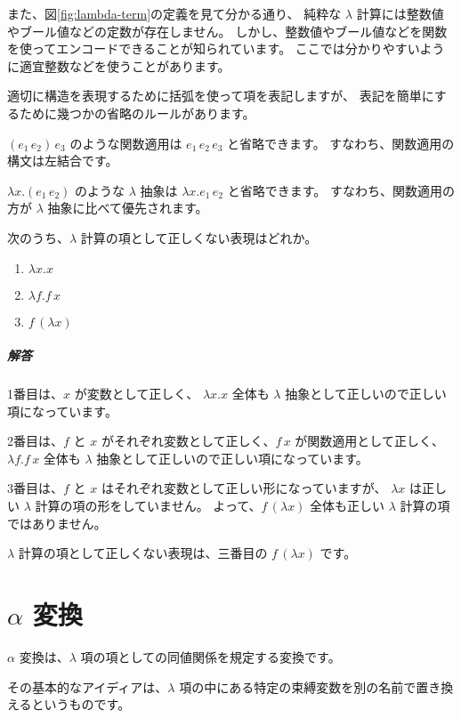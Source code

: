 また、図\ref{fig:lambda-term}の定義を見て分かる通り、
純粋な $\lambda$ 計算には整数値やブール値などの定数が存在しません。
しかし、整数値やブール値などを関数を使ってエンコードできることが知られています。
ここでは分かりやすいように適宜整数などを使うことがあります。

適切に構造を表現するために括弧を使って項を表記しますが、
表記を簡単にするために幾つかの省略のルールがあります。

$(e_1 \, e_2) \, e_3$ のような関数適用は $e_1 \, e_2 \, e_3$ と省略できます。
すなわち、関数適用の構文は左結合です。

$\lambda x. (e_1 \, e_2)$ のような $\lambda$ 抽象は $\lambda x. e_1 \, e_2$ と省略できます。
すなわち、関数適用の方が $\lambda$ 抽象に比べて優先されます。

\begin{exercise}

次のうち、$\lambda$ 計算の項として正しくない表現はどれか。

\begin{enumerate}
  \item $\lambda x . x$
  \item $\lambda f . f \, x$
  \item $f \, (\lambda x)$
\end{enumerate}

\subparagraph{解答}

1番目は、$x$ が変数として正しく、
$\lambda x . x$ 全体も $\lambda$ 抽象として正しいので正しい項になっています。

2番目は、$f$ と $x$ がそれぞれ変数として正しく、$f \, x$ が関数適用として正しく、
$\lambda f . f \, x$ 全体も $\lambda$ 抽象として正しいので正しい項になっています。

3番目は、$f$ と $x$ はそれぞれ変数として正しい形になっていますが、
$\lambda x$ は正しい $\lambda$ 計算の項の形をしていません。
よって、$f \, (\lambda x)$ 全体も正しい $\lambda$ 計算の項ではありません。

$\lambda$ 計算の項として正しくない表現は、三番目の $f \, (\lambda x)$ です。

\end{exercise}

\section{$\alpha$ 変換}

$\alpha$ 変換は、$\lambda$ 項の項としての同値関係を規定する変換です。

その基本的なアイディアは、$\lambda$ 項の中にある特定の束縛変数を別の名前で置き換えるというものです。




